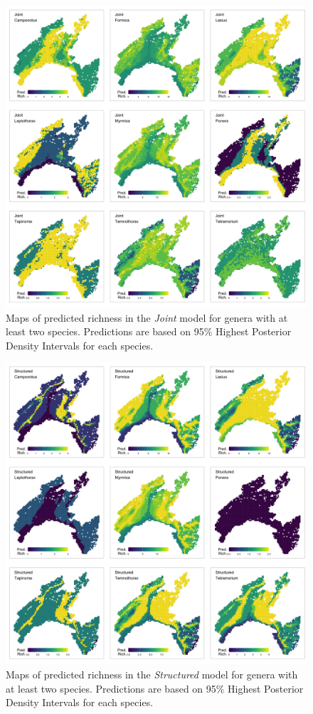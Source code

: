 \documentclass[preprint,review,times,12pt]{elsarticle}
\begin{document}
\begin{figure}
	\centering\includegraphics[width=6in]{ms/1_Ecography/1/figs/maps/gen_S_WY.png}
	\caption{\label{fig:gen_map_Joint} Maps of predicted richness in the \emph{Joint} model for genera with at least two species. Predictions are based on 95\% Highest Posterior Density Intervals for each species. }
\end{figure}

\begin{figure}
	\centering\includegraphics[width=6in]{ms/1_Ecography/1/figs/maps/gen_S_Y.png}
	\caption{\label{fig:gen_map_Structured} Maps of predicted richness in the \emph{Structured} model for genera with at least two species. Predictions are based on 95\% Highest Posterior Density Intervals for each species. }
\end{figure}
\end{document}
